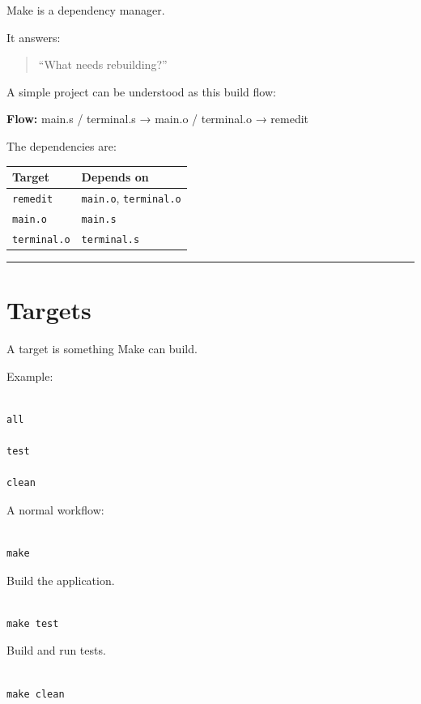 \documentclass[
  oneside,
  openany]{book}
\begin{document}
Make is a dependency manager.

It answers:

\begin{quote}
``What needs rebuilding?''
\end{quote}

A simple project can be understood as this build flow:

\textbf{Flow:} main.s / terminal.s → main.o / terminal.o → remedit

The dependencies are:

\begin{longtable}[]{@{}ll@{}}
\toprule\noalign{}
Target & Depends on \\
\midrule\noalign{}
\endhead
\bottomrule\noalign{}
\endlastfoot
\texttt{remedit} & \texttt{main.o}, \texttt{terminal.o} \\
\texttt{main.o} & \texttt{main.s} \\
\texttt{terminal.o} & \texttt{terminal.s} \\
\end{longtable}

\begin{center}\rule{0.5\linewidth}{0.5pt}\end{center}

\hypertarget{targets}{%
\section{Targets}\label{targets}}

A target is something Make can build.

Example:

\begin{verbatim}

all

test

clean
\end{verbatim}

A normal workflow:

\begin{verbatim}

make
\end{verbatim}

Build the application.

\begin{verbatim}

make test
\end{verbatim}

Build and run tests.

\begin{verbatim}

make clean
\end{verbatim}
\end{document}
